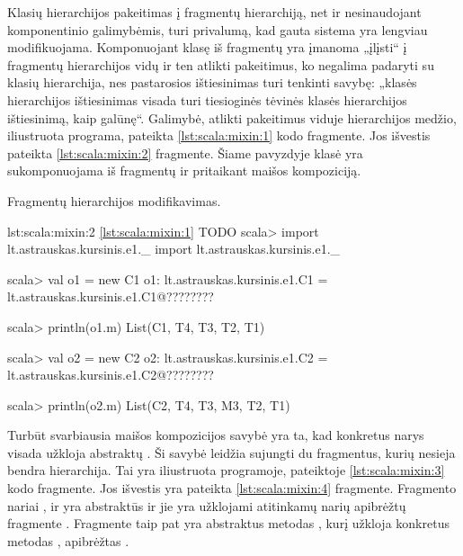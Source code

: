 Klasių hierarchijos pakeitimas į fragmentų hierarchiją, net ir
nesinaudojant komponentinio galimybėmis, turi privalumą, kad
gauta sistema yra lengviau modifikuojama. Komponuojant klasę iš
fragmentų yra įmanoma „įlįsti“ į fragmentų hierarchijos vidų
ir ten atlikti pakeitimus, ko negalima padaryti su klasių hierarchija,
nes pastarosios ištiesinimas turi tenkinti savybę: „klasės hierarchijos
ištiesinimas visada turi tiesioginės tėvinės klasės hierarchijos
ištiesinimą, kaip galūnę“\cite[57p.]{scala-reference}. Galimybė,
atlikti pakeitimus viduje hierarchijos medžio, iliustruota programa,
pateikta \ref{lst:scala:mixin:1} kodo fragmente. Jos išvestis pateikta
\ref{lst:scala:mixin:2} fragmente. Šiame pavyzdyje klasė 
yra sukomponuojama iš fragmentų  ir  pritaikant
maišos kompoziciją.

\begin{scalacodelisting}
  \caption{Fragmentų hierarchijos modifikavimas.}
  \label{lst:scala:mixin:1}
\end{scalacodelisting}

\begin{scalailisting}{lst:scala:mixin:2}{%
  \ref{lst:scala:mixin:1} TODO}
scala> import lt.astrauskas.kursinis.e1._
import lt.astrauskas.kursinis.e1._

scala> val o1 = new C1
o1: lt.astrauskas.kursinis.e1.C1 = lt.astrauskas.kursinis.e1.C1@????????

scala> println(o1.m)
List(C1, T4, T3, T2, T1)

scala> val o2 = new C2
o2: lt.astrauskas.kursinis.e1.C2 = lt.astrauskas.kursinis.e1.C2@????????

scala> println(o2.m)
List(C2, T4, T3, M3, T2, T1)

\end{scalailisting}

Turbūt svarbiausia maišos kompozicijos savybė yra ta, kad konkretus
narys visada užkloja abstraktų
\cite[6]{scalable-component-abstractions}. Ši savybė leidžia
sujungti du fragmentus, kurių nesieja bendra hierarchija. Tai yra
iliustruota programoje, pateiktoje \ref{lst:scala:mixin:3} kodo
fragmente. Jos išvestis yra pateikta \ref{lst:scala:mixin:4}
fragmente. Fragmento  nariai
,  ir  yra abstraktūs
ir jie yra užklojami atitinkamų narių apibrėžtų fragmente
. Fragmente  taip pat yra
abstraktus metodas , kurį užkloja konkretus metodas
, apibrėžtas .

